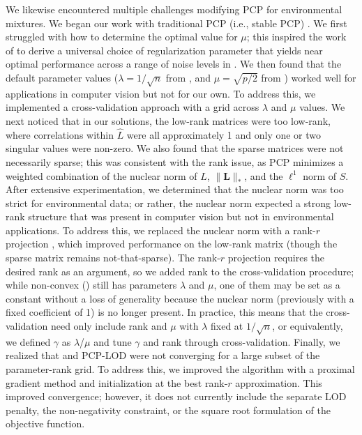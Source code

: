 We likewise encountered multiple challenges modifying PCP for environmental mixtures. We began our work with traditional PCP (i.e., stable PCP) \cite{candes2011robust, zhou2010stable}. We first struggled with how to determine the optimal value for $\mu$; this inspired the work of \citet{cite_zhang} to derive a universal choice of regularization parameter that yields near optimal performance across a range of noise levels in \rootpcpc. We then found that the default parameter values ($\lambda = 1/\sqrt{n}$ from \citet{candes2011robust}, and $\mu = \sqrt{p/2}$ from \citet{cite_zhang}) worked well for applications in computer vision but not for our own. To address this, we implemented a cross-validation approach with a grid across $\lambda$ and $\mu$ values. We next noticed that in our solutions, the low-rank matrices were too low-rank, where correlations within $\hat{L}$ were all approximately 1 and only one or two singular values were non-zero. We also found that the sparse matrices were not necessarily sparse; this was consistent with the rank issue, as PCP minimizes a weighted combination of the nuclear norm of $L$, $\|\boldsymbol{L}\|_{*}$, and the $\ell^1$ norm of $S$. After extensive experimentation, we determined that the nuclear norm was too strict for environmental data; or rather, the nuclear norm expected a strong low-rank structure that was present in computer vision but not in environmental applications. To address this, we replaced the nuclear norm with a rank-$r$ projection \cite{netrapalli2014non, chen2020bridging}, which improved performance on the low-rank matrix (though the sparse matrix remains not-that-sparse). The rank-$r$ projection requires the desired rank as an argument, so we added rank to the cross-validation procedure; while non-convex \rootpcp (\ncpcpc) still has parameters $\lambda$ and $\mu$, one of them may be set as a constant without a loss of generality because the nuclear norm (previously with a fixed coefficient of 1) is no longer present. In practice, this means that the cross-validation need only include rank and $\mu$ with $\lambda$ fixed at $1/\sqrt{n}$, or equivalently, we defined $\gamma$ as $\lambda$/$\mu$ and tune $\gamma$ and rank through cross-validation. Finally, we realized that \ncpcp and PCP-LOD were not converging for a large subset of the parameter-rank grid. To address this, we improved the algorithm with a proximal gradient method and initialization at the best rank-$r$ approximation. This improved convergence; however, it does not currently include the separate LOD penalty, the non-negativity constraint, or the square root formulation of the objective function.

